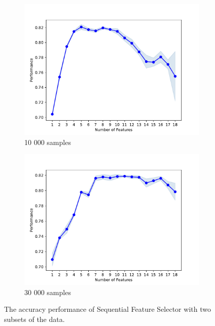 \documentclass[]{article}
\begin{document}
	\begin{figure}[ht]
		\centering
		\begin{subfigure}{\textwidth}
			\centering
		\includegraphics[width=.8\linewidth]{feature selection/feature_num_performance_10k.pdf}
		\caption{10 000 samples}
		\end{subfigure}
		\vspace{1cm} %
		
		\begin{subfigure}{\textwidth}
		\centering
		\includegraphics[width=.8\linewidth]{feature selection/feature_num_performance_30k.pdf}
		\caption{30 000 samples}
		\end{subfigure}
		\caption{The accuracy performance of Sequential Feature Selector with two subsets of the data.}
		\label{fig:SFS_results}
	\end{figure}
	
\end{document}
